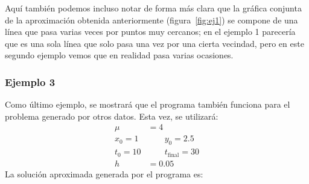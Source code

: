 \documentclass[12pt, a4paper]{article}
\begin{document}
Aquí también podemos incluso notar de forma más clara que la gráfica conjunta de la aproximación obtenida anteriormente (figura~\ref{fig:ej1}) se compone de una línea que pasa varias veces por puntos muy cercanos; en el ejemplo 1 parecería que es una sola línea que solo pasa una vez por una cierta vecindad, pero en este segundo ejemplo vemos que en realidad pasa varias ocasiones.

\subsubsection{Ejemplo 3}

Como último ejemplo, se mostrará que el programa también funciona para el problema generado por otros datos. Esta vez, se utilizará:
\begin{align*}
    \mu &= 4 \\
    x_{0} = 1 &\qquad y_{0} = 2.5 \\
    t_{0} = 10 &\qquad t_{\text{final}} = 30 \\
    h &= 0.05
\end{align*}
La solución aproximada generada por el programa es:
\end{document}
